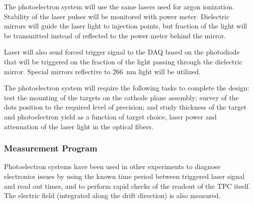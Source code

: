 The photoelectron system will use the same lasers used for argon ionization. Stability of the laser pulses will be monitored  with  power meter. Dielectric mirrors will guide the laser light to injection points, but fraction of the light will be transmitted instead of reflected to the power meter behind the mirror. 

Laser will also send forced trigger signal to the DAQ based on the photodiode that will be triggered on the fraction of the light passing through the dielectric mirror. Special mirrors reflective to \SI{266}{\nano\m} light will be utilized. 

The photoelectron system will require the following tasks to complete the design: test the mounting of the targets on the cathode plane assembly; survey of the dots position to the required level of precision; and  study thickness of the target and photoelectron yield as a function of target choice, laser power and attenuation of the laser light in the optical fibers.


\subsubsection{Measurement Program}
\label{sec:sp-calib-sys-las-pe-meas}

Photoelectron systems have been used in other experiments to diagnose electronics issues by using the known time period between triggered laser signal and read out times, and to perform rapid checks of the readout of the TPC itself. The electric field (integrated along the drift direction) is also measured.

